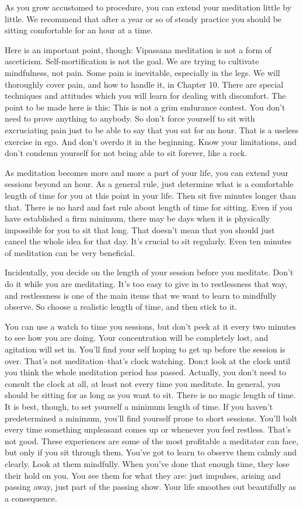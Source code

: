 As you grow accustomed to procedure, you can extend your meditation little by
little. We recommend that after a year or so of steady practice you should be
sitting comfortable for an hour at a time.

Here is an important point, though: Vipassana meditation is not a form of
asceticism. Self-mortification is not the goal. We are trying to cultivate
mindfulness, not pain. Some pain is inevitable, especially in the legs. We will
thoroughly cover pain, and how to handle it, in Chapter 10. There are special
techniques and attitudes which you will learn for dealing with discomfort. The
point to be made here is this: This is not a grim endurance contest. You don't
need to prove anything to anybody. So don't force yourself to sit with
excruciating pain just to be able to say that you sat for an hour. That is a
useless exercise in ego. And don't overdo it in the beginning. Know your
limitations, and don't condemn yourself for not being able to sit forever, like
a rock.

As meditation becomes more and more a part of your life, you can extend your
sessions beyond an hour. As a general rule, just determine what is a comfortable
length of time for you at this point in your life. Then sit five minutes longer
than that. There is no hard and fast rule about length of time for sitting. Even
if you have established a firm minimum, there may be days when it is physically
impossible for you to sit that long. That doesn't mean that you should just
cancel the whole idea for that day. It's crucial to sit regularly. Even ten
minutes of meditation can be very beneficial.

Incidentally, you decide on the length of your session before you meditate.
Don't do it while you are meditating. It's too easy to give in to restlessness
that way, and restlessness is one of the main items that we want to learn to
mindfully observe. So choose a realistic length of time, and then stick to it.

You can use a watch to time you sessions, but don't peek at it every two minutes
to see how you are doing. Your concentration will be completely lost, and
agitation will set in. You'll find your self hoping to get up before the session
is over. That's not meditation--that's clock watching. Don;t look at the clock
until you think the whole meditation period has passed. Actually, you don't need
to consult the clock at all, at least not every time you meditate. In general,
you should be sitting for as long as you want to sit. There is no magic length
of time. It is best, though, to set yourself a minimum length of time. If you
haven't predetermined a minimum, you'll find yourself prone to short sessions.
You'll bolt every time something unpleasant comes up or whenever you feel
restless. That's not good. These experiences are some of the most profitable a
meditator can face, but only if you sit through them. You've got to learn to
observe them calmly and clearly. Look at them mindfully. When you've done that
enough time, they lose their hold on you. You see them for what they are: just
impulses, arising and passing away, just part of the passing show. Your life
smoothes out beautifully as a consequence.

